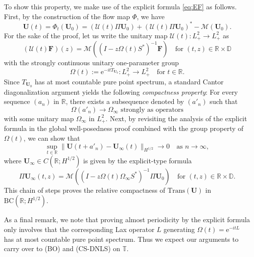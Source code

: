 \documentclass[10pt,reqno,a4paper]{amsart}
\theoremstyle{definition}
\theoremstyle{remark}
\theoremstyle{remark}
\numberwithin{equation}{section}
\newcommand{\BC}{\mathrm{BC}}
\newcommand{\R}{\mathbb{R}}
\newcommand{\T}{\mathbb{T}}
\newcommand{\D}{\mathbb{D}}
\newcommand{\Mean}{\mathscr{M}}
\newcommand{\eu}{\mathrm{e}}
\newcommand{\Ub}{\mathbf{U}}
\newcommand{\Fb}{\mathbf{F}}
\newcommand{\id}{I}
\newcommand{\Om}{\Omega}
\newcommand{\Us}{\mathscr{U}}
\begin{document}
To show this property, we make use of the explicit formula \eqref{eq:EF} as follows. First, by the construction of the flow map $\Phi$, we have
$$
\Ub(t) = \Phi_t(\Ub_0) = (\Us(t) \Pi \Ub_0) + (\Us(t) \Pi \Ub_0)^* - \Mean (\Ub_0).
$$
For the sake of the proof, let us write the unitary map $\Us(t) : L^2_+ \to L^2_+$ as
$$
(\Us(t) \Fb)(z) = \Mean \left ( (\id- z \Om(t) S^*)^{-1} \Fb \right ) \quad \mbox{for $(t, z) \in \R \times \D$}
$$
with the strongly continuous unitary one-parameter group
$$
\Om(t) := \eu^{-it T_{\Ub_0}} : L^2_+ \to L^2_+ \quad \mbox{for $t \in \R$}.
$$
 Since $T_{\Ub_0}$ has at most countable pure point spectrum, a standard Cantor diagonalization argument yields the following {\em compactness property}:  For every sequence $(a_n)$ in $\R$, there exists a subsequence denoted by $(a'_n)$ such that 
$$
\mbox{$\Om(a'_n) \to \Om_\infty$  strongly as operators}
$$ 
with some unitary map $\Om_\infty$ in $L^2_+$. Next, by revisiting the analysis of the explicit formula in the global well-posedness proof combined with the group property of $\Om(t)$, we can show that
$$
\sup_{t \in \R} \| \Ub(t+a'_n) - \Ub_\infty(t) \|_{H^{1/2}} \to 0 \quad \mbox{as $n \to \infty$},
$$
where $\Ub_\infty \in C(\R; H^{1/2})$ is given by the explicit-type formula
$$
\Pi \Ub_\infty(t,z) = \Mean \left ( ( \id - z \Omega(t) \Omega_\infty S^*)^{-1} \Pi \Ub_0 \right ) \quad \mbox{for $(t,z) \in \R \times \D$}.
$$  
This chain of steps proves the relative compactness of $\mathrm{Trans}(\Ub)$ in $\BC(\R; H^{1/2})$.

As a final remark, we note that proving almost periodicity by the explicit formula only involves that the corresponding Lax operator $L$ generating $\Om(t) = \eu^{-it L}$ has at most countable pure point spectrum. Thus we expect our arguments to carry over to (BO) and (CS-DNLS) on $\T$.  
\end{document}
